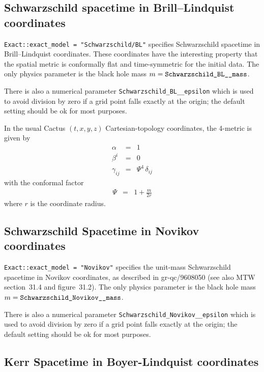 
\subsection{Schwarzschild spacetime in Brill--Lindquist coordinates}

\verb|Exact::exact_model = "Schwarzschild/BL"| specifies Schwarzschild
spacetime in Brill--Lindquist coordinates.  These coordinates have the
interesting property that the spatial metric is conformally flat and
time-symmetric for the initial data.  The only physics parameter is
the black hole mass $m = \verb|Schwarzschild_BL__mass|$.

There is also a numerical parameter \verb|Schwarzschild_BL__epsilon|
which is used to avoid division by zero if a grid point falls exactly
at the origin; the default setting should be ok for most purposes.

In the usual Cactus $(t,x,y,z)$ Cartesian-topology coordinates, the
4-metric is given by
\begin{eqnarray}
   \alpha & = & 1
\\
   \beta^i & = & 0
\\
   \gamma_{ij} & = & \Psi^4\, \delta_{ij}
\end{eqnarray}
with the conformal factor
\begin{eqnarray}
   \Psi & = & 1 + \frac{m}{2r}
\end{eqnarray}
where $r$ is the coordinate radius.



\subsection{Schwarzschild Spacetime in Novikov coordinates}

\verb|Exact::exact_model = "Novikov"| specifies the unit-mass Schwarzschild
spacetime in Novikov coordinates, as described in gr-qc/9608050
(see also MTW section~31.4 and figure~31.2).
The only physics parameter is the black hole mass
$m = \verb|Schwarzschild_Novikov__mass|$.

There is also a numerical parameter \verb|Schwarzschild_Novikov__epsilon|
which is used to avoid division by zero if a grid point falls exactly
at the origin; the default setting should be ok for most purposes.


\subsection{Kerr Spacetime in Boyer-Lindquist coordinates}

